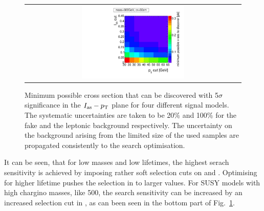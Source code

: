 \begin{figure}[!h]
\begin{tabular}{c}
    \includegraphics[width=0.49\textwidth]{figures/analysis/Optimisation/Madgraph_signal_mass_500_ctau_50cm_ECaloLe5_SOverDeltaBStatPlusSys.pdf} 
  \end{tabular}
  \caption{Minimum possible cross section that can be discovered with 5$\sigma$ significance in the $I_{\text{as}}-p_{\text{T}}$ plane for four different signal models.
           The systematic uncertainties are taken to be 20\% and 100\% for the fake and the leptonic background respectively.
           The uncertainty on the background arising from the limited size of the used samples are propagated consistently to the search optimisation.}
  \vspace{50pt}
  \label{fig:optimisation}
\end{figure} 
It can be seen, that for low masses and low lifetimes, the highest serach sensitivity is achieved by imposing rather soft selection cuts on \ias and \pt.
Optimising for higher lifetime pushes the selection in \pt to larger values.
For SUSY models with high chargino masses, like 500\gev, the search sensitivity can be increased by an increased selection cut in \ias, as can been seen in the bottom part of Fig.~\ref{fig:optimisation}.\\

